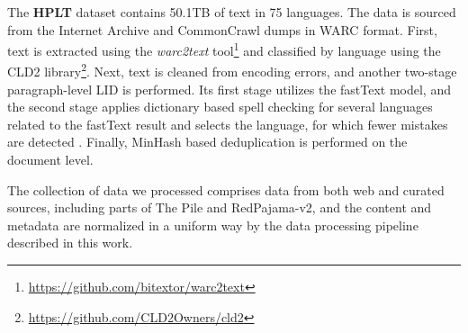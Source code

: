 The \textbf{HPLT} \cite{degilbert_nail_etal2024} dataset contains 50.1TB of text in 75 languages. The data is sourced from
the Internet Archive and CommonCrawl dumps in WARC format. First, text is
extracted using the \textit{warc2text} tool\footnote{\url{https://github.com/bitextor/warc2text}} and classified by language
using the CLD2 library\footnote{\url{https://github.com/CLD2Owners/cld2}}. Next, text is cleaned from encoding errors,
and another two-stage paragraph-level LID is performed. Its first stage
utilizes the fastText model, and the second stage applies dictionary based
spell checking for several languages related to the fastText result and
selects the language, for which fewer mistakes are detected 
\cite{banon_ramirez_etal2024}. Finally, MinHash based deduplication is 
performed on the document level.

The collection of data we processed comprises data from both web and curated sources,
including parts of The Pile and RedPajama-v2, and the content and metadata 
are normalized in a uniform way
by the data processing pipeline described in this work.





